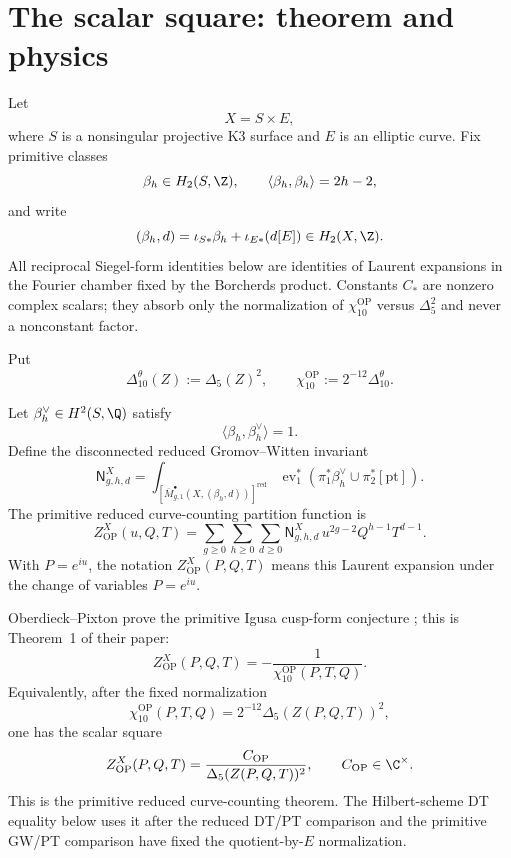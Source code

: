 \section{The scalar square: theorem and physics}
\label{sec:scalar-square-status}

Let
$$X=S\times E,$$
where $S$ is a nonsingular projective K3 surface and $E$ is an elliptic
curve.  Fix primitive classes
$$\beta_h\in H_2(S,\Z),\qquad \langle \beta_h,\beta_h\rangle=2h-2,$$
and write
$$(\beta_h,d)=\iota_{S*}\beta_h+\iota_{E*}(d[E])\in H_2(X,\Z).$$
All reciprocal Siegel-form identities below are identities of Laurent
expansions in the Fourier chamber fixed by the Borcherds product.
Constants $C_*$ are nonzero complex scalars; they absorb only the
normalization of \(\chi_{10}^{\mathrm{OP}}\) versus \(\Delta_5^2\) and
never a nonconstant factor.

Put
$$\Delta_{10}^{\theta}(Z):=\Delta_5(Z)^2,\qquad
\chi_{10}^{\mathrm{OP}}:=2^{-12}\Delta_{10}^{\theta}.$$

\begin{definition}
Let $\beta_h^\vee\in H^2(S,\Q)$ satisfy
$$\langle \beta_h,\beta_h^\vee\rangle=1.$$
Define the disconnected reduced Gromov--Witten invariant
$$
\mathsf N^X_{g,h,d}
=
\int_{[\overline M^{\bullet}_{g,1}(X,(\beta_h,d))]^{\mathrm{red}}}
\operatorname{ev}_1^*
\left(\pi_1^*\beta_h^\vee\cup \pi_2^*[\mathrm{pt}]\right).
$$
The primitive reduced curve-counting partition function is
$$
Z^X_{\mathrm{OP}}(u,Q,T)
=\sum_{g\geq0}\sum_{h\geq0}\sum_{d\geq0}
\mathsf N^X_{g,h,d}\,u^{2g-2}Q^{h-1}T^{d-1}.
$$
With $P=e^{iu}$, the notation $Z^X_{\mathrm{OP}}(P,Q,T)$ means this
Laurent expansion under the change of variables $P=e^{iu}$.
\end{definition}

\begin{theorem}
\label{thm:op-primitive-square-status}
Oberdieck--Pixton prove the primitive Igusa cusp-form conjecture
\cite{OB}; this is Theorem~1 of their paper:
$$
Z^X_{\mathrm{OP}}(P,Q,T)
=-\frac{1}{\chi_{10}^{\mathrm{OP}}(P,T,Q)}.
$$
Equivalently, after the fixed normalization
$$\chi_{10}^{\mathrm{OP}}(P,T,Q)=2^{-12}\Delta_5(Z(P,Q,T))^2,$$
one has the scalar square
$$
Z^X_{\mathrm{OP}}(P,Q,T)
=\frac{C_{\mathrm{OP}}}{\Delta_5(Z(P,Q,T))^2},
\qquad C_{\mathrm{OP}}\in\C^\times.
$$
This is the primitive reduced curve-counting theorem.  The
Hilbert-scheme DT equality below uses it after the reduced DT/PT
comparison and the primitive GW/PT comparison have fixed the
quotient-by-\(E\) normalization.
\end{theorem}

